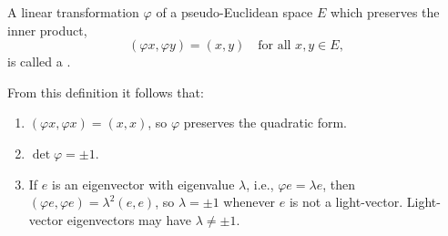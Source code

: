 A linear transformation $\varphi$ of a pseudo-Euclidean space $E$ which preserves the inner product,
$$(\varphi x, \varphi y) = (x, y) \quad \text{for all } x, y \in E,$$
is called a .

From this definition it follows that:
\begin{enumerate}
  \item $(\varphi x, \varphi x) = (x, x)$, so $\varphi$ preserves the quadratic form.
  \item $\det \varphi = \pm 1$.
  \item If $e$ is an eigenvector with eigenvalue $\lambda$, i.e., $\varphi e = \lambda e$, then $(\varphi e, \varphi e) = \lambda^2 (e, e)$, so $\lambda = \pm 1$ whenever $e$ is not a light-vector. Light-vector eigenvectors may have $\lambda \neq \pm 1$.
\end{enumerate}
